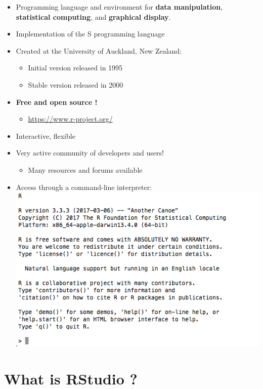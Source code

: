 \documentclass[]{book}
\providecommand{\tightlist}{%
  \setlength{\itemsep}{0pt}\setlength{\parskip}{0pt}}
\begin{document}
\begin{itemize}
\item
  Programming language and environment for \textbf{data manipulation}, \textbf{statistical computing}, and \textbf{graphical display}.
\item
  Implementation of the S programming language
\item
  Created at the University of Auckland, New Zealand:

  \begin{itemize}
  \tightlist
  \item
    Initial version released in 1995
  \item
    Stable version released in 2000
  \end{itemize}
\item
  \textbf{Free and open source !}

  \begin{itemize}
  \tightlist
  \item
    \url{https://www.r-project.org/}
  \end{itemize}
\item
  Interactive, flexible
\item
  Very active community of developers and users!

  \begin{itemize}
  \tightlist
  \item
    Many resources and forums available
  \end{itemize}
\item
  Access through a command-line interpreter:
  \includegraphics{images/rterminal.png}
\end{itemize}

\hypertarget{what-is-rstudio}{%
\chapter{What is RStudio ?}\label{what-is-rstudio}}
\end{document}
